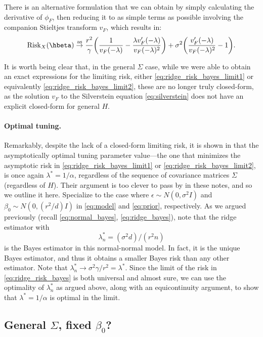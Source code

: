 \documentclass{article}
\begin{document}
There is an alternative formulation that we can obtain by simply calculating the 
derivative of $\phi_F$, then reducing it to as simple terms as possible
involving the companion Stieltjes transform $v_F$, which results in:     
\begin{equation}
\label{eq:ridge_risk_bayes_limit2}
\Risk_X(\hbeta) \asto \frac{r^2}{\gamma} \bigg( \frac{1}{v_F(-\lambda)} -
  \frac{\lambda v'_F(-\lambda)}{v_F(-\lambda)^2} \bigg) + \sigma^2 \bigg( 
  \frac{v'_F(-\lambda)}{v_F(-\lambda)^2} - 1 \bigg).
\end{equation}

It is worth being clear that, in the general $\Sigma$ case, while we were able
to obtain an exact expressions for the limiting risk, either
\eqref{eq:ridge_risk_bayes_limit1} or equivalently
\eqref{eq:ridge_risk_bayes_limit2}, these are no longer truly closed-form, as
the solution $v_F$ to the Silverstein equation \eqref{eq:silverstein} does not
have an explicit closed-form for general $H$.  

\paragraph{Optimal tuning.}

Remarkably, despite the lack of a closed-form limiting risk, it is shown in
\citet{dobriban2018high} that the asymptotically optimal tuning parameter
value---the one that minimizes the asymptotic risk in
\eqref{eq:ridge_risk_bayes_limit1} or \eqref{eq:ridge_risk_bayes_limit2}, is
once again $\lambda^* = 1/\alpha$, regardless of the sequence of covariance
matrices $\Sigma$ (regardless of $H$). Their argument is too clever to pass by
in these notes, and so we outline it here. Specialize to the case where
$\epsilon \sim N(0,\sigma^2 I)$ and $\beta_0 \sim N(0, (r^2/d) I)$ in
\eqref{eq:model} and \eqref{eq:prior}, respectively. As we argued previously
(recall \eqref{eq:normal_bayes}, \eqref{eq:ridge_bayes}), note that the ridge
estimator with
\[
\lambda^*_n = (\sigma^2 d)/(r^2 n)
\]
is the Bayes estimator in this normal-normal model. In fact, it is the unique
Bayes estimator, and thus it obtains a smaller Bayes risk than any other
estimator. Note that $\lambda^*_n \to \sigma^2 \gamma / r^2= \lambda^*$. Since 
the limit of the risk in \eqref{eq:ridge_risk_bayes} is both universal and
almost sure, we can use the optimality of $\lambda^*_n$ as argued above, along
with an equicontinuity argument, to show that $\lambda^* = 1/\alpha$ is optimal
in the limit.  

\subsection{General $\Sigma$, fixed $\beta_0$?}
\end{document}
